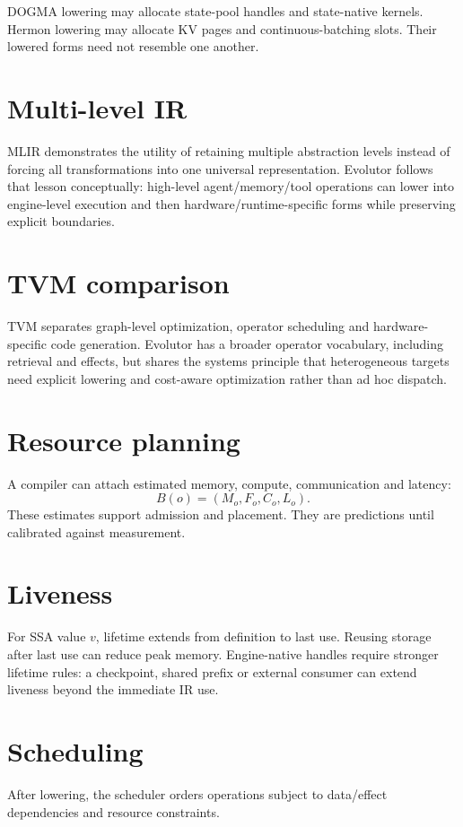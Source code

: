 DOGMA lowering may allocate state-pool handles and state-native kernels. Hermon lowering may allocate KV pages and continuous-batching slots. Their lowered forms need not resemble one another.

\section{Multi-level IR}
MLIR demonstrates the utility of retaining multiple abstraction levels instead of forcing all transformations into one universal representation. Evolutor follows that lesson conceptually: high-level agent/memory/tool operations can lower into engine-level execution and then hardware/runtime-specific forms while preserving explicit boundaries.

\section{TVM comparison}
TVM separates graph-level optimization, operator scheduling and hardware-specific code generation. Evolutor has a broader operator vocabulary, including retrieval and effects, but shares the systems principle that heterogeneous targets need explicit lowering and cost-aware optimization rather than ad hoc dispatch.

\section{Resource planning}
A compiler can attach estimated memory, compute, communication and latency:
\[
B(o)=(M_o,F_o,C_o,L_o).
\]
These estimates support admission and placement. They are predictions until calibrated against measurement.

\section{Liveness}
For SSA value $v$, lifetime extends from definition to last use. Reusing storage after last use can reduce peak memory. Engine-native handles require stronger lifetime rules: a checkpoint, shared prefix or external consumer can extend liveness beyond the immediate IR use.

\section{Scheduling}
After lowering, the scheduler orders operations subject to data/effect dependencies and resource constraints.

